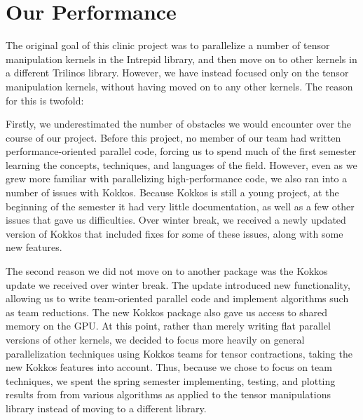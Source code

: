 
\chapter{Our Performance}

The original goal of this clinic project was to parallelize a number of tensor
manipulation kernels in the Intrepid library, and then move on to other kernels
in a different Trilinos library.  However, we have instead focused only on the
tensor manipulation kernels, without having moved on to any other kernels. The
reason for this is twofold:

Firstly, we underestimated the number of obstacles we would encounter over the
course of our project.  Before this project, no member of our team had written
performance-oriented parallel code, forcing us to spend much of the first
semester learning the concepts, techniques, and languages of the field.
However, even as we grew more familiar with parallelizing high-performance code,
we also ran into a number of issues with Kokkos.  Because Kokkos is still a
young project, at the beginning of the semester it had very little
documentation, as well as a few other issues that gave us difficulties.  Over
winter break, we received a newly updated version of Kokkos that included fixes
for some of these issues, along with some new features.

The second reason we did not move on to another package was the Kokkos update we
received over winter break.  The update introduced new functionality, allowing
us to write team-oriented parallel code and implement algorithms such as team
reductions.  The new Kokkos package also gave us access to shared memory on the
GPU. At this point, rather than merely writing flat parallel versions of other
kernels, we decided to focus more heavily on general parallelization techniques
using Kokkos teams for tensor contractions, taking the new Kokkos features into
account.  Thus, because we chose to focus on team techniques, we spent the
spring semester implementing, testing, and plotting results from from various
algorithms as applied to the tensor manipulations library instead of moving to a
different library.
